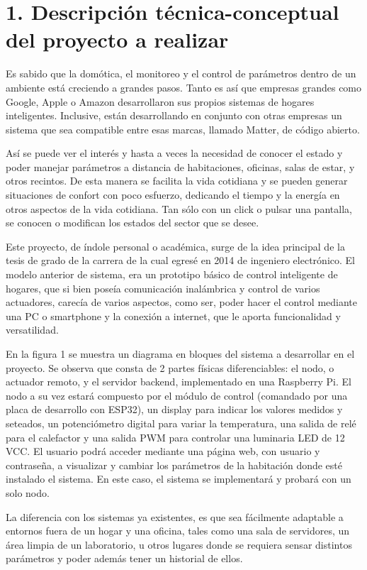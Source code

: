 \documentclass[
11pt, %
]{charter}
\begin{document}
\section{1. Descripción técnica-conceptual del proyecto a realizar}
\label{sec:descripcion}

Es sabido que la domótica, el monitoreo y el control de parámetros dentro de un ambiente está creciendo a grandes pasos. Tanto es así que empresas grandes como Google, Apple o Amazon desarrollaron sus propios sistemas de hogares inteligentes. Inclusive, están desarrollando en conjunto con otras empresas un sistema que sea compatible entre esas marcas, llamado Matter, de código abierto.

Así se puede ver el interés y hasta a veces la necesidad de conocer el estado y poder manejar parámetros a distancia de habitaciones, oficinas, salas de estar, y otros recintos. De esta manera se facilita la vida cotidiana y se pueden generar situaciones de confort con poco esfuerzo, dedicando el tiempo y la energía en otros aspectos de la vida cotidiana. Tan sólo con un click o pulsar una pantalla, se conocen o modifican los estados del sector que se desee.

Este proyecto, de índole personal o académica, surge de la idea principal de la tesis de grado de la carrera de la cual egresé en 2014 de ingeniero electrónico. El modelo anterior de sistema, era un prototipo básico de control inteligente de hogares, que si bien poseía comunicación inalámbrica y control de varios actuadores, carecía de varios aspectos, como ser, poder hacer el control mediante una PC o smartphone y la conexión a internet, que le aporta funcionalidad y versatilidad.

En la figura 1 se muestra un diagrama en bloques del sistema a desarrollar en el proyecto. Se observa que consta de 2 partes físicas diferenciables: el nodo, o actuador remoto, y el servidor backend, implementado en una Raspberry Pi. El nodo a su vez estará compuesto por el módulo de control (comandado por una placa de desarrollo con ESP32), un display para indicar los valores medidos y seteados, un potenciómetro digital para variar la temperatura, una salida de relé para el calefactor y una salida PWM para controlar una luminaria LED de 12 VCC. El usuario podrá acceder mediante una página web, con usuario y contraseña, a visualizar y cambiar los parámetros de la habitación donde esté instalado el sistema. En este caso, el sistema se implementará y probará con un solo nodo.

La diferencia con los sistemas ya existentes, es que sea fácilmente adaptable a entornos fuera de un hogar y una oficina, tales como una sala de servidores, un área limpia de un laboratorio, u otros lugares donde se requiera sensar distintos parámetros y poder además tener un historial de ellos.
\end{document}
